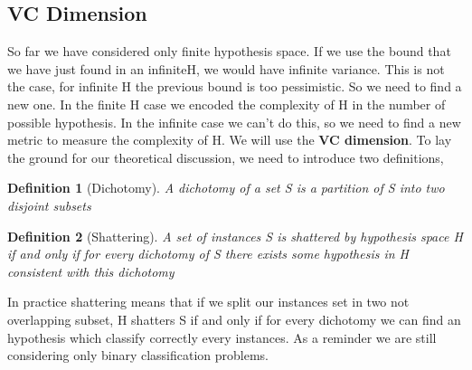 \documentclass[main.tex]{subfiles}
\newtheorem{definition}{Definition}[section]
\begin{document}
\subsection{VC Dimension}
So far we have considered only finite hypothesis space. If we use the bound that we have just found in an infinite\footnotemark H, we would have infinite variance. This is not the case, for infinite H the previous bound is too pessimistic. So we need to find a new one. In the finite H case we encoded the complexity of H in the number of possible hypothesis. In the infinite case we can't do this, so we need to find a new metric to measure the complexity of H. We will use the \textbf{VC dimension}. To lay the ground for our theoretical discussion, we need to introduce two definitions,
\begin{definition}[Dichotomy]
A dichotomy of a set S is a partition of S into two disjoint subsets
\end{definition}
\begin{definition}[Shattering]
A set of instances S is shattered by hypothesis space H if and only if for
every dichotomy of S there exists some hypothesis in H consistent with this
dichotomy
\end{definition}
In practice shattering means that if we split our instances set in two not overlapping subset, H shatters S if and only if for every dichotomy we can find an hypothesis which classify correctly every instances. As a reminder we are still considering only binary classification problems.
\end{document}
